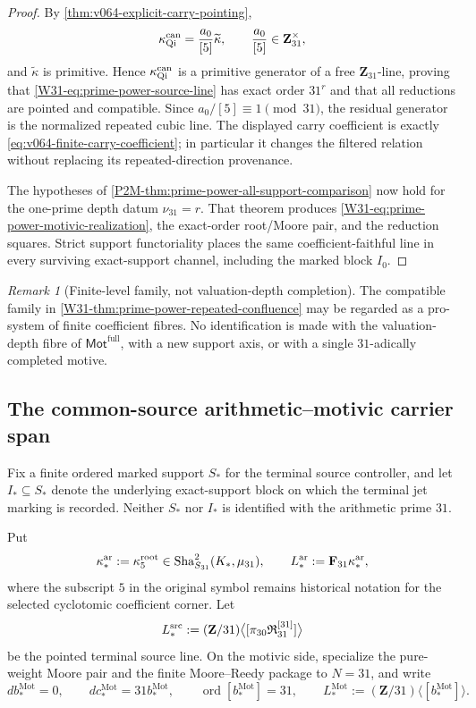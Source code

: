 \documentclass[11pt]{article}
\theoremstyle{remark}
\newtheorem{remark}[theorem]{Remark}
\newcommand{\Mot}{\mathrm{Mot}}
\providecommand{\FullMot}{\mathsf{Mot}^{\mathrm{full}}}
\providecommand{\Sha}{\operatorname{Sha}}
\begin{document}
\begin{proof}
By \cref{thm:v064-explicit-carry-pointing},
\[
 \kappa_{\rm Qi}^{\rm can}
 =\frac{a_0}{[5]}\widetilde\kappa,
 \qquad
 \frac{a_0}{[5]}\in\mathbf Z_{31}^{\times},
\]
and \(\widetilde\kappa\) is primitive.  Hence
\(\kappa_{\rm Qi}^{\rm can}\) is a primitive generator of a free
\(\mathbf Z_{31}\)-line, proving that
\eqref{W31-eq:prime-power-source-line} has exact order \(31^r\) and that all
reductions are pointed and compatible.  Since \(a_0/[5]\equiv1\pmod{31}\),
the residual generator is the normalized repeated cubic line.  The displayed
carry coefficient is exactly
\eqref{eq:v064-finite-carry-coefficient}; in particular it changes the
filtered relation without replacing its repeated-direction provenance.

The hypotheses of
\cref{P2M-thm:prime-power-all-support-comparison} now hold for the one-prime
depth datum \(\nu_{31}=r\).  That theorem produces
\eqref{W31-eq:prime-power-motivic-realization}, the exact-order root/Moore pair,
and the reduction squares.  Strict support functoriality places the same
coefficient-faithful line in every surviving exact-support channel, including
the marked block \(I_0\).
\end{proof}

\begin{remark}[Finite-level family, not valuation-depth completion]
\label{W31-rem:prime-power-family-not-completion}
The compatible family in
\cref{W31-thm:prime-power-repeated-confluence} may be regarded as a pro-system
of finite coefficient fibres.  No identification is made with the
valuation-depth fibre of \(\FullMot\), with a new support axis, or with a
single \(31\)-adically completed motive.
\end{remark}

\subsection{The common-source arithmetic--motivic carrier span}

Fix a finite ordered marked support \(S_*\) for the terminal source controller,
and let \(I_*\subseteq S_*\) denote the underlying exact-support block on which
the terminal jet marking is recorded.  Neither \(S_*\) nor \(I_*\) is
identified with the arithmetic prime \(31\).

Put
\[
 \kappa_*^{\rm ar}:=\kappa_5^{\rm root}
 \in\Sha^2_{S_{31}}(K_*,\mu_{31}),
 \qquad
 L_*^{\rm ar}:=\mathbf F_{31}\kappa_*^{\rm ar},
\]
where the subscript \(5\) in the original symbol remains historical notation
for the selected cyclotomic coefficient corner.  Let
\[
 L_*^{\rm src}
 :=(\mathbf Z/31)
   \bigl\langle[\pi_{30}\mathfrak R_{31}^{[31]}]\bigr\rangle
\]
be the pointed terminal source line.  On the motivic side, specialize the
pure-weight Moore pair and the finite Moore--Reedy package to \(N=31\), and
write
\[
 db_*^{\Mot}=0,\qquad
 dc_*^{\Mot}=31b_*^{\Mot},\qquad
 \operatorname{ord}[b_*^{\Mot}]=31,
 \qquad
 L_*^{\Mot}:=(\mathbf Z/31)\langle[b_*^{\Mot}]\rangle .
\]
\end{document}

